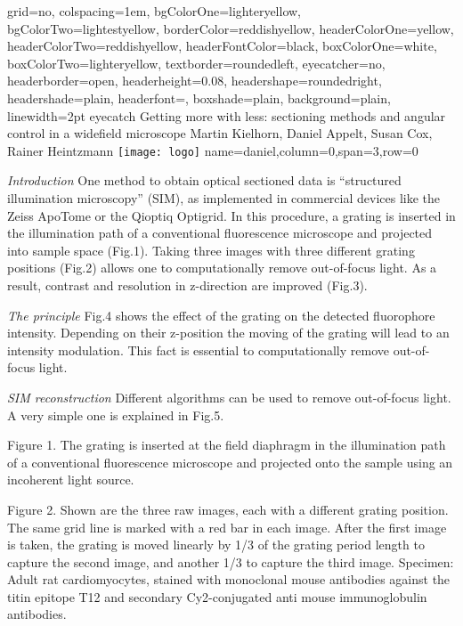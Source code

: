 \documentclass[portrait,draft]{baposter}
\begin{document}
\begin{poster}{%
    grid=no,
    colspacing=1em,
    bgColorOne=lighteryellow,
    bgColorTwo=lightestyellow,
    borderColor=reddishyellow,
    headerColorOne=yellow,
    headerColorTwo=reddishyellow,
    headerFontColor=black,
    boxColorOne=white, %
    boxColorTwo=lighteryellow,
    textborder=roundedleft,
    eyecatcher=no,
    headerborder=open,
    headerheight=0.08\textheight,
    headershape=roundedright,
    headershade=plain,
    headerfont=\Large\textsf, %
    boxshade=plain,
    background=plain,
    linewidth=2pt}
  {eyecatch} 
  {Getting more with less: sectioning methods and angular
    control in a widefield microscope} 
  {Martin Kielhorn, Daniel Appelt, Susan Cox, Rainer Heintzmann} {
    \texttt{[image: logo]}
  }
  {name=daniel,column=0,span=3,row=0}{
    {}
    \emph{Introduction}
    One method to obtain optical sectioned data is “structured
    illumination microscopy” (SIM), as implemented in commercial
    devices like the Zeiss ApoTome or the Qioptiq Optigrid. In this
    procedure, a grating is inserted in the illumination path of a
    conventional fluorescence microscope and projected into sample
    space (Fig.1). Taking three images with three different grating
    positions (Fig.2) allows one to computationally remove
    out-of-focus light. As a result, contrast and resolution in
    z-direction are improved (Fig.3).

    \emph{The principle} Fig.4 shows the effect of the grating on the
    detected fluorophore intensity. Depending on their z-position the
    moving of the grating will lead to an intensity modulation. This
    fact is essential to computationally remove out-of-focus light.

    \emph{SIM reconstruction} Different algorithms can be used to
    remove out-of-focus light. A very simple one is explained in
    Fig.5.


    Figure 1. The grating is inserted at the field diaphragm in the
    illumination path of a conventional fluorescence microscope and
    projected onto the sample using an incoherent light source.

    Figure 2. Shown are the three raw images, each with a different
    grating position. The same grid line is marked with a red bar in
    each image. After the first image is taken, the grating is moved
    linearly by 1/3 of the grating period length to capture the second
    image, and another 1/3 to capture the third image. Specimen: Adult
    rat cardiomyocytes, stained with monoclonal mouse antibodies
    against the titin epitope T12 and secondary Cy2-conjugated anti
    mouse immunoglobulin antibodies.

}
\end{poster}
\end{document}
